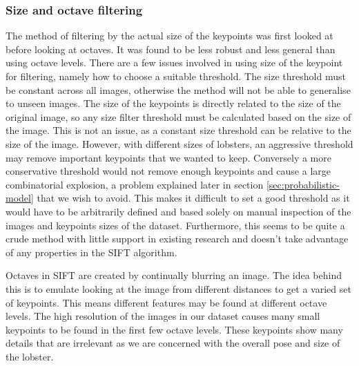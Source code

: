 \subsubsection{Size and octave filtering}
The method of filtering by the actual size of the keypoints was first looked at before looking at octaves. It was found to be less robust and less general than using octave levels. There are a few issues involved in using size of the keypoint for filtering, namely how to choose a suitable threshold. The size threshold must be constant across all images, otherwise the method will not be able to generalise to unseen images. The size of the keypoints is directly related to the size of the original image, so any size filter threshold must be calculated based on the size of the image. This is not an issue, as a constant size threshold can be relative to the size of the image. However, with different sizes of lobsters, an aggressive threshold may remove important keypoints that we wanted to keep. Conversely a more conservative threshold would not remove enough keypoints and cause a large combinatorial explosion, a problem explained later in section \ref{sec:probabilistic-model} that we wish to avoid. This makes it difficult to set a good threshold as it would have to be arbitrarily defined and based solely on manual inspection of the images and keypoints sizes of the dataset. Furthermore, this seems to be quite a crude method with little support in existing research and doesn't take advantage of any properties in the SIFT algorithm. 

Octaves in SIFT are created by continually blurring an image. The idea behind this is to emulate looking at the image from different distances to get a varied set of keypoints. This means different features may be found at different octave levels. The high resolution of the images in our dataset causes many small keypoints to be found in the first few octave levels. These keypoints show many details that are irrelevant as we are concerned with the overall pose and size of the lobster.

